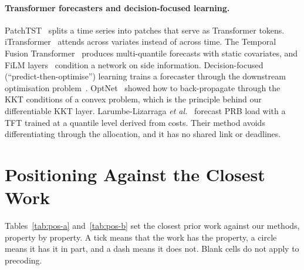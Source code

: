 \paragraph{Transformer forecasters and decision-focused learning.} PatchTST~\cite{nie2023} splits a time series into patches that serve as Transformer tokens. iTransformer~\cite{liu2024} attends across variates instead of across time. The Temporal Fusion Transformer~\cite{lim2021} produces multi-quantile forecasts with static covariates, and FiLM layers~\cite{perez2018film} condition a network on side information. Decision-focused (``predict-then-optimise'') learning trains a forecaster through the downstream optimisation problem~\cite{donti2017,elmachtoub2022}. OptNet~\cite{amos2017optnet} showed how to back-propagate through the KKT conditions of a convex problem, which is the principle behind our differentiable KKT layer. Larumbe-Lizarraga \emph{et al.}~\cite{larumbe2026} forecast PRB load with a TFT trained at a quantile level derived from costs. Their method avoids differentiating through the allocation, and it has no shared link or deadlines.

\section{Positioning Against the Closest Work}
\label{sec:lit-pos}

\providecommand{\yes}{\checkmark}
\providecommand{\no}{--}
\providecommand{\half}{$\circ$}

Tables~\ref{tab:pos-a} and~\ref{tab:pos-b} set the closest prior work against our methods, property by property. A tick means that the work has the property, a circle means it has it in part, and a dash means it does not. Blank cells do not apply to precoding.

